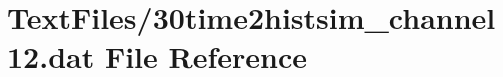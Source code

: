 \hypertarget{30time2histsim__channel12_8dat}{}\section{Text\+Files/30time2histsim\+\_\+channel12.dat File Reference}
\label{30time2histsim__channel12_8dat}
